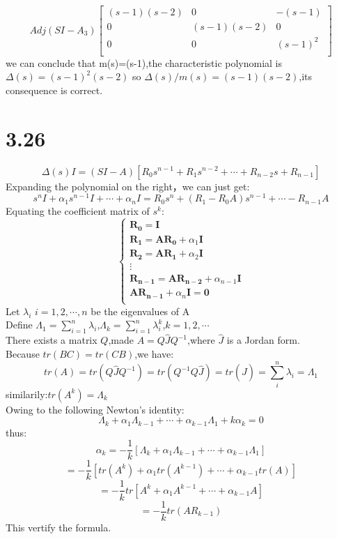 \documentclass{article}
\begin{document}
\[
Adj(SI-A_3)  
\left[
\begin{array}{ccc}
(s-1)(s-2) & 0 & -(s-1)\\
0 & (s-1)(s-2) & 0\\
0 & 0 & (s-1)^2\\
\end{array}
\right]
\]
we can conclude that m(s)=(s-1),the characteristic polynomial is$\Delta(s)=(s-1)^2(s-2)$
so $\Delta(s)/m(s)=(s-1)(s-2)$,its consequence is correct.

    
\section*{3.26}
\[\Delta(s)I=(SI-A)[R_0s^{n-1}+R_1s^{n-2}+\cdots+R_{n-2}s+R_{n-1}]\]
Expanding the polynomial on the right，we can just get:
\[s^{n}I+\alpha_1s^{n-1}I+\cdots+\alpha_nI=R_0s^{n}+(R_1-R_0A)s^{n-1}+\cdots-R_{n-1}A\]
Equating the coefficient matrix of $s^{k}$:
\[
\left\{
\begin{array}{ll}
\boldsymbol{R_0}=\boldsymbol{I}\\
\boldsymbol{R_1}=\boldsymbol{AR_0}+\alpha_1\boldsymbol{I}\\
\boldsymbol{R_2}=\boldsymbol{AR_1}+\alpha_2\boldsymbol{I}\\
\boldsymbol{\vdots}\\
\boldsymbol{R_{n-1}}=\boldsymbol{AR_{n-2}}+\alpha_{n-1}\boldsymbol{I}\\
\boldsymbol{AR_{n-1}}+\alpha_n\boldsymbol{I}=\boldsymbol{0}\\
\end{array}\right.
\]
Let $\lambda_i$ \quad \quad $i=1,2,\cdots,n$ be the eigenvalues of A\\
Define $\Lambda_1=\sum_{i=1}^{n}\lambda_i$,$\Lambda_k=\sum_{i=1}^{n}\lambda_i^{k}$,$k=1,2,\cdots$\\
There exists a matrix $Q$,made $A=Q\hat{J}Q^{-1}$,where $\hat{J}$ is a Jordan form.\\
Because $tr(BC)=tr(CB)$,we have:\\
\[tr(A)=tr(Q\hat{J}Q^{-1})=tr(Q^{-1}Q\hat{J})=tr(\hat{J})=\sum_i^n\lambda_i=\Lambda_1\]
similarily:$tr(A^k)=\Lambda_k$\\
Owing to the following Newton's identity:\\
\[\Lambda_k+\alpha_1\Lambda_{k-1}+\cdots+\alpha_{k-1}\Lambda_1+k\alpha_k=0\]
thus:\\
\[\alpha_k=-\frac{1}{k}[\Lambda_k+\alpha_1\Lambda_{k-1}+\cdots+\alpha_{k-1}\Lambda_1]\]
\[=-\frac{1}{k}[tr(A^k)+\alpha_1tr(A^{k-1})+\cdots+\alpha_{k-1}tr(A)]\]
\[=-\frac{1}{k}tr[A^k+\alpha_1A^{k-1}+\cdots+\alpha_{k-1}A]\]
\[=-\frac{1}{k}tr(AR_{k-1})\]
This vertify the formula.\\
\end{document}
